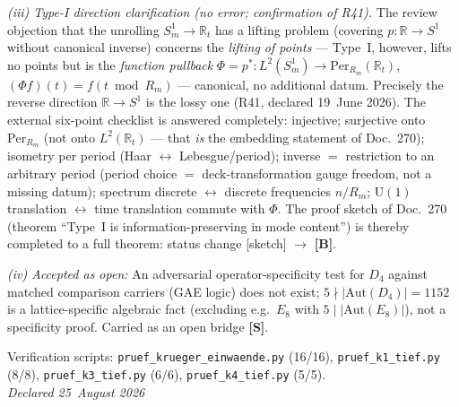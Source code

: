 \emph{(iii) Type-I direction clarification (no error; confirmation of R41).}
The review objection that the unrolling $S^1_m \to \mathbb{R}_t$ has a
lifting problem (covering $p:\mathbb{R}\to S^1$ without canonical inverse)
concerns the \emph{lifting of points} --- Type~I, however, lifts no
points but is the \emph{function pullback}
$\Phi = p^*: L^2(S^1_m) \to \mathrm{Per}_{R_m}(\mathbb{R}_t)$,
$(\Phi f)(t) = f(t \bmod R_m)$ --- canonical, no additional datum.
Precisely the reverse direction $\mathbb{R}\to S^1$ is the lossy one
(R41, declared 19~June 2026). The external six-point checklist is
answered completely: injective; surjective onto
$\mathrm{Per}_{R_m}$ (not onto $L^2(\mathbb{R}_t)$ --- that \emph{is}
the embedding statement of Doc.~270); isometry per period
(Haar $\leftrightarrow$ Lebesgue/period); inverse $=$ restriction to
an arbitrary period (period choice $=$ deck-transformation gauge freedom,
not a missing datum); spectrum discrete $\leftrightarrow$ discrete
frequencies $n/R_m$; $\mathrm{U}(1)$ translation $\leftrightarrow$
time translation commute with $\Phi$.
The proof sketch of Doc.~270 (theorem ``Type~I is information-preserving
in mode content'') is thereby completed to a full theorem:
status change [sketch] $\to$ \textbf{[B]}.

\emph{(iv) Accepted as open:} An adversarial operator-specificity test
for $D_4$ against matched comparison carriers (GAE logic) does not exist;
$5 \nmid |\mathrm{Aut}(D_4)| = 1152$ is a lattice-specific algebraic
fact (excluding e.g.\ $E_8$ with $5 \mid |\mathrm{Aut}(E_8)|$),
not a specificity proof. Carried as an open bridge \textbf{[S]}.

Verification scripts: \texttt{pruef\_krueger\_einwaende.py} (16/16),
\texttt{pruef\_k1\_tief.py} (8/8), \texttt{pruef\_k3\_tief.py} (6/6),
\texttt{pruef\_k4\_tief.py} (5/5).\\
\emph{Declared 25~August 2026}

\medskip

